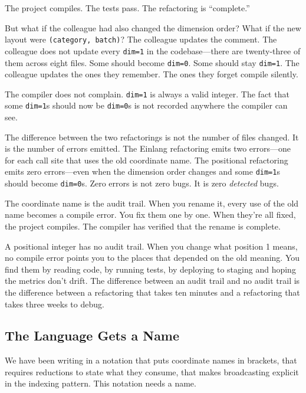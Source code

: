 \documentclass[11pt,titlepage]{article}
\begin{document}
The project compiles. The tests pass. The refactoring is ``complete.''

But what if the colleague had also changed the dimension order? What if
the new layout were \texttt{(category,\ batch)}? The colleague updates
the comment. The colleague does not update every \texttt{dim=1} in the
codebase---there are twenty-three of them across eight files. Some
should become \texttt{dim=0}. Some should stay \texttt{dim=1}. The
colleague updates the ones they remember. The ones they forget compile
silently.

The compiler does not complain. \texttt{dim=1} is always a valid
integer. The fact that some \texttt{dim=1}s should now be
\texttt{dim=0}s is not recorded anywhere the compiler can see.

The difference between the two refactorings is not the number of files
changed. It is the number of errors emitted. The Einlang refactoring
emits two errors---one for each call site that uses the old coordinate
name. The positional refactoring emits zero errors---even when the
dimension order changes and some \texttt{dim=1}s should become
\texttt{dim=0}s. Zero errors is not zero bugs. It is zero
\emph{detected} bugs.

The coordinate name is the audit trail. When you rename it, every use of
the old name becomes a compile error. You fix them one by one. When
they're all fixed, the project compiles. The compiler has verified that
the rename is complete.

A positional integer has no audit trail. When you change what position 1
means, no compile error points you to the places that depended on the
old meaning. You find them by reading code, by running tests, by
deploying to staging and hoping the metrics don't drift. The difference
between an audit trail and no audit trail is the difference between a
refactoring that takes ten minutes and a refactoring that takes three
weeks to debug.

\vspace{2em}

\hypertarget{the-language-gets-a-name}{%
\subsection{The Language Gets a Name}\label{the-language-gets-a-name}}

We have been writing in a notation that puts coordinate names in
brackets, that requires reductions to state what they consume, that
makes broadcasting explicit in the indexing pattern. This notation needs
a name.
\end{document}
